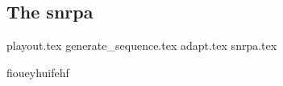 \subsection{The \acrlong{snrpa}}%
\label{sub:the_snrpa}

{playout.tex}
{generate_sequence.tex}
{adapt.tex}
{snrpa.tex}

fioueyhuifehf

